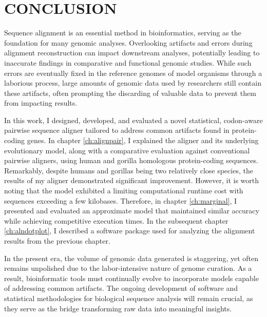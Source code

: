 \chapter{CONCLUSION}

Sequence alignment is an essential method in bioinformatics, serving as the foundation for many genomic analyses. Overlooking artifacts and errors during alignment reconstruction can impact downstream analyses, potentially leading to inaccurate findings in comparative and functional genomic studies. While such errors are eventually fixed in the reference genomes of model organisms through a laborious process, large amounts of genomic data used by researchers still contain these artifacts, often prompting the discarding of valuable data to prevent them from impacting results.

In this work, I designed, developed, and evaluated a novel statistical, codon-aware pairwise sequence aligner tailored to address common artifacts found in protein-coding genes. In chapter \ref{ch:alignpair}, I explained the aligner and its underlying evolutionary model, along with a comparative evaluation against conventional pairwise aligners, using human and gorilla homologous protein-coding sequences. Remarkably, despite humans and gorillas being two relatively close species, the results of my aligner demonstrated significant improvement. However, it is worth noting that the model exhibited a limiting computational runtime cost with sequences exceeding a few kilobases. Therefore, in chapter \ref{ch:marginal}, I presented and evaluated an approximate model that maintained similar accuracy while achieving competitive execution times. In the subsequent chapter \ref{ch:alndotplot}, I described a software package used for analyzing the alignment results from the previous chapter.

In the present era, the volume of genomic data generated is staggering, yet often remains unpolished due to the labor-intensive nature of genome curation. As a result, bioinformatic tools must continually evolve to incorporate models capable of addressing common artifacts. The ongoing development of software and statistical methodologies for biological sequence analysis will remain crucial, as they serve as the bridge transforming raw data into meaningful insights.
